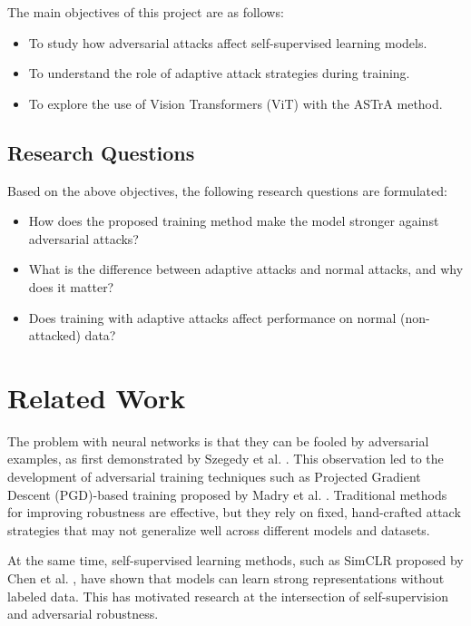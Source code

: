 \documentclass[conference]{IEEEtran}
\begin{document}
The main objectives of this project are as follows:

\begin{itemize}
    \item To study how adversarial attacks affect self-supervised learning models.

    \item To understand the role of adaptive attack strategies during training.

    \item To explore the use of Vision Transformers (ViT) with the ASTrA method.
\end{itemize}

\subsection{Research Questions}

Based on the above objectives, the following research questions are formulated:

\begin{itemize}
    \item How does the proposed training method make the model stronger against adversarial attacks?

    \item What is the difference between adaptive attacks and normal attacks, and why does it matter?

    \item Does training with adaptive attacks affect performance on normal (non-attacked) data?
\end{itemize}


\section{Related Work}

The problem with neural networks is that they can be fooled by adversarial examples, as first demonstrated by Szegedy et al. \cite{b7}. This observation led to the development of adversarial training techniques such as Projected Gradient Descent (PGD)-based training proposed by Madry et al. \cite{b8}. Traditional methods for improving robustness are effective, but they rely on fixed, hand-crafted attack strategies that may not generalize well across different models and datasets.

At the same time, self-supervised learning methods, such as SimCLR proposed by Chen et al. \cite{b9}, have shown that models can learn strong representations without labeled data. This has motivated research at the intersection of self-supervision and adversarial robustness.
\end{document}

